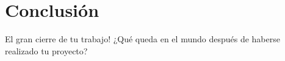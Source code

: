 
\chapter{Conclusión} %

\label{Cap_Conclusion} %

El gran cierre de tu trabajo! ¿Qué queda en el mundo después de haberse realizado tu proyecto?